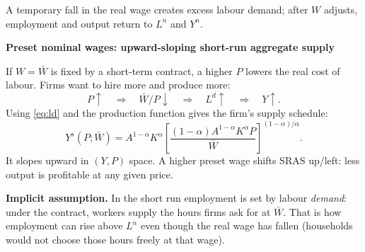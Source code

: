 \documentclass[11pt,letterpaper]{article}
\newcommand{\topic}[1]{\par\Needspace{4\baselineskip}\medskip\textbf{#1}\par\nobreak}
\newcommand{\w}{\omega}
\begin{document}
\begin{center}
\end{center}
{\small A temporary fall in the real wage creates excess labour demand; after
$W$ adjusts, employment and output return to $L^n$ and $Y^n$.}

\topic{Preset nominal wages: upward-sloping short-run aggregate supply}
If $W=\bar W$ is fixed by a short-term contract, a higher $P$ lowers the real
cost of labour. Firms want to hire more and produce more:
\[
 P\uparrow\quad\Longrightarrow\quad \bar W/P\downarrow
 \quad\Longrightarrow\quad L^d\uparrow\quad\Longrightarrow\quad Y\uparrow.
\]
Using \eqref{eq:ld} and the production function gives the firm's supply schedule:
\begin{equation}
 Y^s(P;\bar W)=A^{1-\alpha}K^\alpha
 \left[\frac{(1-\alpha)A^{1-\alpha}K^\alpha P}{\bar W}\right]^{(1-\alpha)/\alpha}.
 \label{eq:sras}
\end{equation}
It slopes upward in $(Y,P)$ space. A higher preset wage shifts SRAS up/left:
less output is profitable at any given price.

\textbf{Implicit assumption.} In the short run employment is set by labour
\emph{demand}: under the contract, workers supply the hours firms ask for at $\bar W$.
That is how employment can rise above $L^n$ even though the real wage has fallen
(households would not choose those hours freely at that wage).
\end{document}
